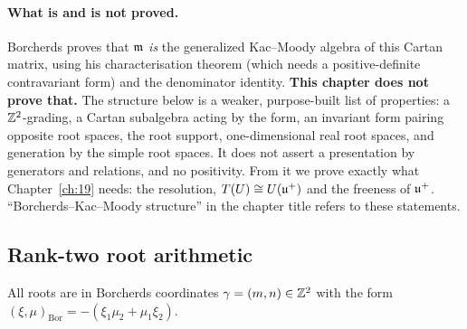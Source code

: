 \paragraph{What is and is not proved.}  Borcherds proves that $\mathfrak{m}$ \emph{is} the generalized Kac--Moody algebra of this Cartan
matrix, using his characterisation theorem (which needs a positive-definite contravariant form) and the denominator identity.
\textbf{This chapter does not prove that.}  The structure  below is a weaker, purpose-built list of
properties: a ${\mathbb{Z}}^2$-grading, a Cartan subalgebra acting by the form, an invariant form pairing opposite root spaces, the root
support, one-dimensional real root spaces, and generation by the simple root spaces.  It does not assert a presentation by
generators and relations, and no positivity.  From it we prove exactly what Chapter~\ref{ch:19} needs: the resolution, $T(U)\cong\mathcal
\mathcal U(\mathfrak{u}^+)$ and the freeness of $\mathfrak{u}^+$.  ``Borcherds--Kac--Moody structure'' in the chapter title refers to these statements.

\subsection{Rank-two root arithmetic}

All roots are in Borcherds coordinates $\gamma=(m,n)\in{\mathbb{Z}}^2$ with the form $(\xi,\mu)_{\mathrm{Bor}}=-(\xi_1\mu_2+\mu_1\xi_2)$.

